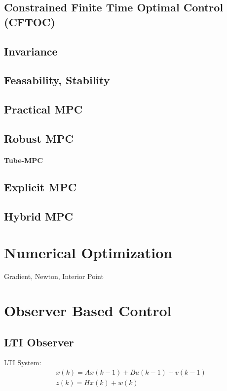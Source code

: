 \documentclass[landscape,a4paper,8pt]{scrartcl}
\begin{document}
\begin{multicols*}{3}
\subsection{Constrained Finite Time Optimal Control (CFTOC)}

\subsection{Invariance}
\subsection{Feasability, Stability}

\subsection{Practical MPC}
\subsection{Robust MPC}
\paragraph{Tube-MPC}

\subsection{Explicit MPC}

\subsection{Hybrid MPC}

\section{Numerical Optimization}
Gradient, Newton, Interior Point


\section{Observer Based Control}
\subsection{LTI Observer}
LTI System: 
\begin{align*}
& x(k) = A x(k-1) + B u (k-1) + v(k-1) \\
& z(k) = H x(k) + w(k)
\end{align*}


\end{multicols*}
\end{document}
